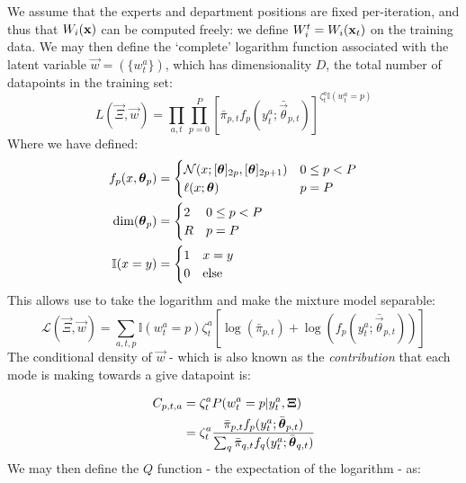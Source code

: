 	We assume that the experts and department positions are fixed per-iteration, and thus that $W_i(\mathbf{\boldsymbol{\mathrm{x}}})$ can be computed freely: we define $W_i^t = W_i(\mathbf{\boldsymbol{\mathrm{x}}}_t)$ on the training data. We may then define the `complete' logarithm function associated with the latent variable $\vec{w} = (\{w_t^a\})$, which has dimensionality $D$, the total number of datapoints in the training set:
	\begin{equation}
		L(\vec{\Xi},\vec{w}) = \prod_{a,t} \prod_{p=0}^P \left[ \bar{\pi}_{p,t} f_p(y_t^a ; \bar{\vec{\theta}}_{p,t}) \right]^{\zeta_t^a \mathbb{I}(w_t^a = p)}
	\end{equation}
	Where we have defined:
	\begin{equation}
		\begin{split}
			f_p(x,\mathbf{\boldsymbol{\mathrm{\theta}}}_p) & = \begin{cases}
				                          \mathcal{N}(x; [\mathbf{\boldsymbol{\mathrm{\theta}}}]_{2p}, [\mathbf{\boldsymbol{\mathrm{\theta}}}]_{2p+1}) & 0 \leq p < P
				                          \\
				                          \ell(x; \mathbf{\boldsymbol{\mathrm{\theta}}})                    & p= P
			                          \end{cases}
			\\
			\text{dim}(\mathbf{\boldsymbol{\mathrm{\theta}}}_p)     & = \begin{cases}
				                          2 & 0 \leq p < P
				                          \\
				                          R & p = P
			                          \end{cases}
			\\
			\mathbb{I}(x=y)       & = \begin{cases} 1 & x = y \\ 0 & \text{else} \end{cases}
		\end{split}
	\end{equation}
	This allows use to take the logarithm and make the mixture model separable:
	\begin{equation}
		\mathcal{L}(\vec{\Xi},\vec{w}) = \sum_{a,t,p} \mathbb{I}(w_t^a = p) \zeta_t^a\left[ \log(\bar{\pi}_{p,t}) + \log(f_p(y_t^a; \bar{\vec{\theta}}_{p,t})) \right]
	\end{equation}
	The conditional density of $\vec{w}$ - which is also known as the \textit{contribution} that each mode is making towards a give datapoint is:

	\begin{equation}
		\begin{split}
			C_{p,t,a} & = \zeta_t^a P(w_t^a = p | y_t^a, \mathbf{\boldsymbol{\mathrm{\Xi}}})
			\\
			          & = \zeta_t^a \frac{\bar{\pi}_{p,t} f_p(y_t^a; \bar{\mathbf{\boldsymbol{\mathrm{\theta}}}}_{p,t})}{\sum_q\bar{\pi}_{q,t} f_q(y_t^a; \bar{\mathbf{\boldsymbol{\mathrm{\theta}}}}_{q,t})}
		\end{split}
	\end{equation}
	We may then define the $Q$ function - the expectation of the logarithm - as:

